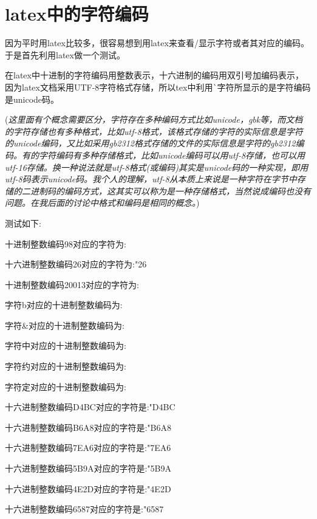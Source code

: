 \documentclass[twoside,11pt]{book}
\begin{document}
\section{latex中的字符编码}
因为平时用latex比较多，很容易想到用latex来查看/显示字符或者其对应的编码。于是首先利用latex做一个测试。

在latex中十进制的字符编码用整数表示，十六进制的编码用双引号加编码表示，因为latex文档采用UTF-8字符格式存储，所以tex中利用\verb|`|字符所显示的是字符编码是unicode码。

(\emph{这里面有个概念需要区分，字符存在多种编码方式比如unicode，gbk等，而文档的字符存储也有多种格式，比如utf-8格式，该格式存储的字符的实际信息是字符的unicode编码，又比如采用gb2312格式存储的文件的实际信息是字符的gb2312编码。有的字符编码有多种存储格式，比如unicode编码可以用utf-8存储，也可以用utf-16存储。换一种说法就是utf-8格式(或编码)其实是unicode码的一种实现，即用utf-8码表示unicode码。我个人的理解，utf-8从本质上来说是一种字符在字节中存储的二进制码的编码方式，这其实可以称为是一种存储格式，当然说成编码也没有问题。在我后面的讨论中格式和编码是相同的概念。})

测试如下:

十进制整数编码98对应的字符为:

十六进制整数编码26对应的字符为:\char"26

十进制整数编码20013对应的字符为:

字符b对应的十进制整数编码为:
\setcounter{charcode}{`b}
\thecharcode

字符\&对应的十进制整数编码为:
\setcounter{charcode}{`\&}
\thecharcode

字符中对应的十进制整数编码为:
\setcounter{charcode}{`中}
\thecharcode

字符约对应的十进制整数编码为:
\setcounter{charcode}{`约}
\thecharcode

字符定对应的十进制整数编码为:
\setcounter{charcode}{`定}
\thecharcode

十六进制整数编码D4BC对应的字符是:\char"D4BC

十六进制整数编码B6A8对应的字符是:\char"B6A8

十六进制整数编码7EA6对应的字符是:\char"7EA6

十六进制整数编码5B9A对应的字符是:\char"5B9A

十六进制整数编码4E2D对应的字符是:\char"4E2D

十六进制整数编码6587对应的字符是:\char"6587
\end{document}
